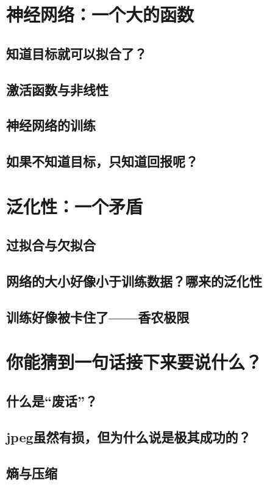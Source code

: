 \documentclass[UTF8, 12pt]{article}
\begin{document}
\section{神经网络：一个大的函数}
\subsection{知道目标就可以拟合了？}
\subsection{激活函数与非线性}
\subsection{神经网络的训练}
\subsection{如果不知道目标，只知道回报呢？}

\section{泛化性：一个矛盾}
\subsection{过拟合与欠拟合}
\subsection{网络的大小好像小于训练数据？哪来的泛化性}
\subsection{训练好像被卡住了——香农极限}

\section{你能猜到一句话接下来要说什么？}
\subsection{什么是“废话”？}
\subsection{jpeg虽然有损，但为什么说是极其成功的？}
\subsection{熵与压缩}
\end{document}
